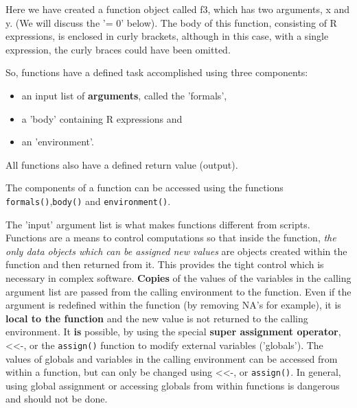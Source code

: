 \documentclass[titlepage]{book}\usepackage{knitr}
\begin{document}
Here we have created a function object called f3, which has two arguments, x and y. (We will discuss the '= 0' below). The body of this function, consisting of R expressions, is enclosed in curly brackets, although in this case, with a single expression, the curly braces could have been omitted.

So, functions have a defined task accomplished using three components:
\begin{itemize}
\item{an input list of \textbf{arguments}, called the 'formals',}
\item{a 'body' containing R expressions and}
\item{an 'environment'.}
\end{itemize}

All functions also have a defined return value (output).

The components of a function can be accessed using the functions \texttt{formals()},\texttt{body()} and \texttt{environment()}.

\begin{knitrout}
\color{fgcolor}\begin{kframe}
\begin{alltt}
 \hlkwb{<-} 
 \hlkwb{<-} 
\end{alltt}
\end{kframe}
\end{knitrout}


The 'input' argument list is what makes functions different from scripts. Functions are a means to control computations so that inside the function, \emph{the only data objects which can be  assigned new values} are objects created within the function and then returned from it. This provides the tight control which is necessary in complex software. \textbf{Copies} of the values of the variables in the calling argument list are passed from the calling environment to the function.  Even if the argument is redefined within the function (by removing NA's for example), it is \textbf{local to the function} and the new value is not returned to the calling environment. It \textbf{is} possible, by using the special \textbf{super assignment operator}, <<-, or the \texttt{assign()} function to modify external variables ('globals'). The values of globals and variables in the calling environment can be accessed from within a function, but can only be changed using  <<-, or \texttt{assign()}. In general, using global assignment or accessing globals from within functions is dangerous and should not be done.
\end{document}
